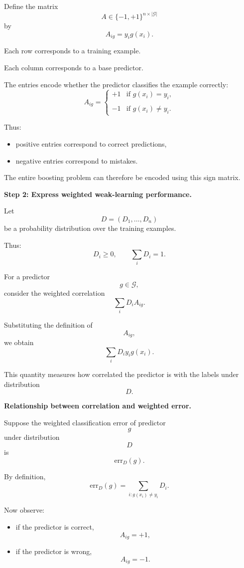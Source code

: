 \documentclass[11pt]{article}
\begin{document}
\begin{enumerate}
\begin{solutionbox}
Define the matrix
\[
A\in\{-1,+1\}^{n\times |\mathcal G|}
\]
by
\[
A_{ig}
=
y_ig(x_i).
\]

Each row corresponds to a training example.

Each column corresponds to a base predictor.

The entries encode whether the predictor classifies the example correctly:
\[
A_{ig}
=
\begin{cases}
+1 & \text{if } g(x_i)=y_i,\\\\
-1 & \text{if } g(x_i)\neq y_i.
\end{cases}
\]

Thus:
\begin{itemize}
    \item positive entries correspond to correct predictions,
    \item negative entries correspond to mistakes.
\end{itemize}

The entire boosting problem can therefore be encoded using this sign matrix.

\medskip

\textbf{Step 2: Express weighted weak-learning performance.}

Let
\[
D=(D_1,\ldots,D_n)
\]
be a probability distribution over the training examples.

Thus:
\[
D_i\ge0,
\qquad
\sum_iD_i=1.
\]

For a predictor
\[
g\in\mathcal G,
\]
consider the weighted correlation
\[
\sum_iD_iA_{ig}.
\]

Substituting the definition of
\[
A_{ig},
\]
we obtain
\[
\sum_iD_iy_ig(x_i).
\]

This quantity measures how correlated the predictor is with the labels under distribution
\[
D.
\]

\medskip

\textbf{Relationship between correlation and weighted error.}

Suppose the weighted classification error of predictor
\[
g
\]
under distribution
\[
D
\]
is
\[
\mathrm{err}_D(g).
\]

By definition,
\[
\mathrm{err}_D(g)
=
\sum_{i:g(x_i)\neq y_i}D_i.
\]

Now observe:
\begin{itemize}
    \item if the predictor is correct,
    \[
    A_{ig}=+1,
    \]
    \item if the predictor is wrong,
    \[
    A_{ig}=-1.
    \]
\end{itemize}


\end{solutionbox}
\end{enumerate}
\end{document}
